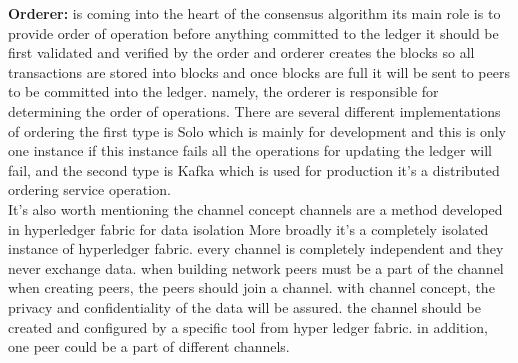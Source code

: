 \textbf{Orderer:} is coming into the heart of the consensus algorithm its main role is to provide order of operation before anything committed to the ledger it should be first validated and verified by the order and orderer creates the blocks so all transactions are stored into blocks and once blocks are full it will be sent to peers to be committed into the ledger. namely, the orderer is responsible for determining the order of operations.
There are several different implementations of ordering the first type is Solo which is mainly for development and this is only one instance if this instance fails all the operations for updating the ledger will fail, and the second type is Kafka which is used for production it's a distributed ordering service operation. \\

It's also worth mentioning the channel concept channels are a method developed in hyperledger fabric for data isolation More broadly it's a completely isolated instance of hyperledger fabric. every channel is completely independent and they never exchange data. when building network peers must be a part of the channel when creating peers, the peers should join a channel. with channel concept, the privacy and confidentiality of the data will be assured. the channel should be created and configured by a specific tool from hyper ledger fabric. in addition, one peer could be a part of different channels.  
 



 



 
  